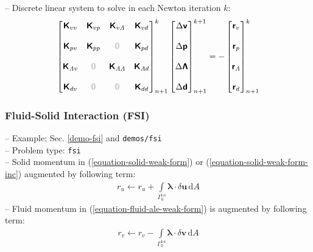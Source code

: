 \documentclass[a4paper,12pt]{report}
\newcommand{\fS}{\text{s}}
\newcommand{\fF}{\text{f}}
\newcommand{\bs}[1]{\boldsymbol{#1}}
\newcommand{\Gm}{\mathit{\Gamma}}
\newcommand{\zerom}{\textcolor{lightgray}{\bs{\mathsf{0}}}}
\newcommand{\ROP}{\bs{\mathsf{r}}}
\newcommand{\LMZ}{\bs{\mathsf{\Lambda}}}
\newcommand{\lmzi}{\mathit{\Lambda}} %
\begin{document}
-- Discrete linear system to solve in each Newton iteration $k$:
\begin{equation}
\label{equation-lin-sys-fluid-ale-0d}
\begin{aligned}
\begin{bmatrix} \bs{\mathsf{K}}_{vv} & \bs{\mathsf{K}}_{vp} & \bs{\mathsf{K}}_{v\lmzi} & \bs{\mathsf{K}}_{vd} \\ \\ \bs{\mathsf{K}}_{pv} & \bs{\mathsf{K}}_{pp} & \zerom & \bs{\mathsf{K}}_{pd} \\ \\ \bs{\mathsf{K}}_{\lmzi v} & \zerom & \bs{\mathsf{K}}_{\lmzi \lmzi} & \bs{\mathsf{K}}_{\lmzi d} \\ \\ \bs{\mathsf{K}}_{dv}  & \zerom & \zerom & \bs{\mathsf{K}}_{dd} \end{bmatrix}_{n+1}^{k}\begin{bmatrix} \Delta\bs{\mathsf{v}} \\ \\ \Delta\bs{\mathsf{p}} \\ \\ \Delta\LMZ \\ \\ \Delta\bs{\mathsf{d}} \end{bmatrix}_{n+1}^{k+1}=-\begin{bmatrix} \ROP_{v} \\ \\ \ROP_{p} \\ \\ \ROP_{\lmzi} \\ \\ \ROP_{d}\end{bmatrix}_{n+1}^{k}
\end{aligned}
\end{equation}


\subsubsection{Fluid-Solid Interaction (FSI)}\label{fluid-solid-interaction-fsi}

-- Example: Sec. \ref{demo-fsi} and \verb"demos/fsi"\\

-- Problem type: \verb"fsi"\\

-- Solid momentum in (\ref{equation-solid-weak-form}) or (\ref{equation-solid-weak-form-inc}) augmented by following term:
\begin{equation}
\begin{aligned}
r_u \leftarrow r_u + \int\limits_{\Gm_0^{\fF\text{-}\fS}}\bs{\lambda}\cdot\delta\bs{u}\,\mathrm{d}A
\end{aligned}
\end{equation}
-- Fluid momentum in (\ref{equation-fluid-ale-weak-form}) is augmented by following term:
\begin{equation}
\begin{aligned}
r_v \leftarrow r_v - \int\limits_{\Gm_0^{\fF\text{-}\fS}}\bs{\lambda}\cdot\delta\bs{v}\,\mathrm{d}A
\end{aligned}
\end{equation}
\end{document}
